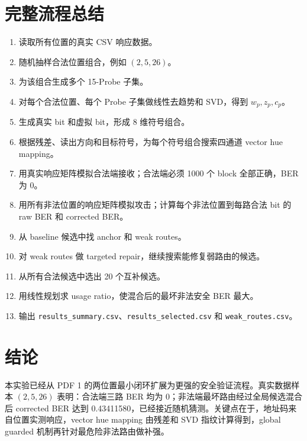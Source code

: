 \documentclass[UTF8,a4paper,11pt]{ctexart}
\begin{document}
\section{完整流程总结}

\begin{enumerate}[label=(\arabic*)]
  \item 读取所有位置的真实 CSV 响应数据。
  \item 随机抽样合法位置组合，例如 $(2,5,26)$。
  \item 为该组合生成多个 15-Probe 子集。
  \item 对每个合法位置、每个 Probe 子集做线性去趋势和 SVD，得到 $w_p,z_p,c_p$。
  \item 生成真实 bit 和虚拟 bit，形成 8 维符号组合。
  \item 根据残差、读出方向和目标符号，为每个符号组合搜索四通道 vector hue mapping。
  \item 用真实响应矩阵模拟合法端接收；合法端必须 1000 个 block 全部正确，BER 为 0。
  \item 用所有非法位置的响应矩阵模拟攻击；计算每个非法位置到每路合法 bit 的 raw BER 和 corrected BER。
  \item 从 baseline 候选中找 anchor 和 weak routes。
  \item 对 weak routes 做 targeted repair，继续搜索能修复弱路由的候选。
  \item 从所有合法候选中选出 20 个互补候选。
  \item 用线性规划求 usage ratio，使混合后的最坏非法安全 BER 最大。
  \item 输出 \texttt{results\_summary.csv}、\texttt{results\_selected.csv} 和 \texttt{weak\_routes.csv}。
\end{enumerate}

\section{结论}

本实验已经从 PDF 1 的两位置最小闭环扩展为更强的安全验证流程。真实数据样本 $(2,5,26)$ 表明：合法端三路 BER 均为 0；非法端最坏路由经过全局候选混合后 corrected BER 达到 0.43411580，已经接近随机猜测。关键点在于，地址码来自位置实测响应，vector hue mapping 由残差和 SVD 指纹计算得到，global guarded 机制再针对最危险非法路由做补强。
\end{document}
